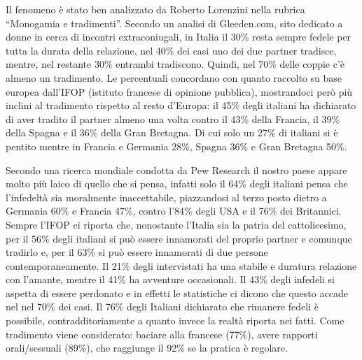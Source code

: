 \documentclass[12pt]{book} %
\begin{document}
Il fenomeno è stato ben analizzato da Roberto Lorenzini nella rubrica “Monogamia e tradimenti”. Secondo un analisi di
Gleeden.com, sito dedicato a donne in cerca di incontri extraconiugali, in Italia il 30\% resta sempre fedele per tutta
la durata della relazione, nel 40\% dei casi uno dei due partner tradisce, mentre, nel restante 30\% entrambi
tradiscono. Quindi, nel 70\% delle coppie c'è almeno un tradimento. Le percentuali concordano con
quanto raccolto su base europea dall'IFOP (istituto francese di opinione pubblica), mostrandoci
però più inclini al tradimento rispetto al resto d'Europa: il 45\% degli italiani ha dichiarato di
aver tradito il partner almeno una volta contro il 43\% della Francia, il 39\% della Spagna e il 36\% della Gran
Bretagna. Di cui solo un 27\% di italiani si è pentito mentre in Francia e Germania 28\%, Spagna 36\% e Gran Bretagna
50\%. 

Secondo una ricerca mondiale condotta da Pew
Research il nostro paese appare molto più laico di quello che si pensa, infatti solo il 64\% degli italiani pensa che
l'infedeltà sia moralmente inaccettabile, piazzandosi al terzo posto dietro a Germania 60\% e
Francia 47\%, contro l'84\% degli USA e il 76\% dei Britannici. Sempre l'IFOP
ci riporta che, nonostante l'Italia sia la patria del cattolicesimo, per il 56\% degli italiani si
può essere innamorati del proprio partner e comunque tradirlo e, per il 63\% si può essere innamorati di due persone
contemporaneamente. Il 21\% degli intervistati ha una stabile e duratura relazione con l'amante,
mentre il 41\% ha avventure occasionali. Il 43\% degli infedeli si aspetta di essere perdonato e in effetti le
statistiche ci dicono che questo accade nel nel 70\% dei casi. Il 76\% degli Italiani dichiarato che rimanere fedeli è
possibile, contradditoriamente a quanto invece la realtà riporta nei fatti. Come tradimento viene considerato: baciare
alla francese (77\%), avere rapporti orali/sessuali (89\%), che raggiunge il 92\% se la pratica è regolare. 
\newline
\newline
\end{document}
